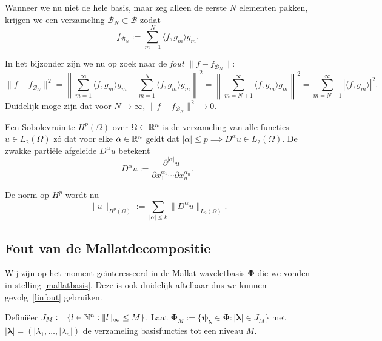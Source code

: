 \begin{gevolg}
\label{linfout}
Wanneer we nu niet de hele basis, maar zeg alleen de eerste $N$ elementen pakken, krijgen we een verzameling $\mathcal{B}_N \subset \mathcal{B}$ zodat
\[
f_{\mathcal{B}_N} := \sum_{m = 1}^N \langle f, g_m \rangle g_m.
\]

In het bijzonder zijn we nu op zoek naar de \emph{fout} $\| f - f_{\mathcal{B}_N} \|$:
\[
\| f - f_{\mathcal{B}_N} \|^2 = \left\| \sum_{m=1}^\infty\langle f, g_m \rangle g_m - \sum_{m=1}^N \langle f, g_m \rangle g_m \right\|^2 = \left\| \sum_{m=N+1}^\infty\langle f, g_m \rangle g_m \right\|^2 = \sum_{m=N+1}^\infty | \langle f, g_m \rangle |^2.
\]
Duidelijk moge zijn dat voor $N \to \infty$, $\| f - f_{\mathcal{B}_N} \|^2 \to 0$.
\end{gevolg}

\begin{definitie}[Sobolevruimte]
Een Sobolevruimte $H^p(\Omega)$ over $\Omega \subset \mathbb{R}^n$ is de verzameling van alle functies $u \in L_2(\Omega)$ z\'o dat voor elke $\alpha \in \mathbb{R}^n$ geldt dat $|\alpha| \leq p \implies D^\alpha u \in L_2(\Omega)$. De zwakke parti\"ele afgeleide $D^\alpha u$ betekent
\[
	D^\alpha u := \frac{\partial^{|\alpha|} u}{\partial x_1^{\alpha_1} \cdots \partial x_n^{\alpha_n} }.
\]

De norm op $H^p$ wordt nu
\[
	\| u \|_{H^p(\Omega)} := \sum_{|\alpha| \leq k} \| D^\alpha u \|_{L_2(\Omega)}.
\]
\end{definitie}

\subsection{Fout van de Mallatdecompositie}
Wij zijn op het moment ge\"interesseerd in de Mallat-waveletbasis $\boldsymbol\Phi$ die we vonden in stelling \ref{mallatbasis}. Deze is ook duidelijk aftelbaar dus we kunnen gevolg~\ref{linfout} gebruiken. 

Defini\"eer $J_M := \{ l \in \mathbb{N}^n: \| l \|_\infty \leq M \}$. Laat $\boldsymbol\Phi_M := \{ \boldsymbol{\psi}_{\boldsymbol{\lambda}} \in \boldsymbol\Phi: |\boldsymbol\lambda| \in J_M \}$ met $|\boldsymbol\lambda| = (|\lambda_1, \ldots, |\lambda_n|)$ de verzameling basisfuncties tot een niveau $M$.

